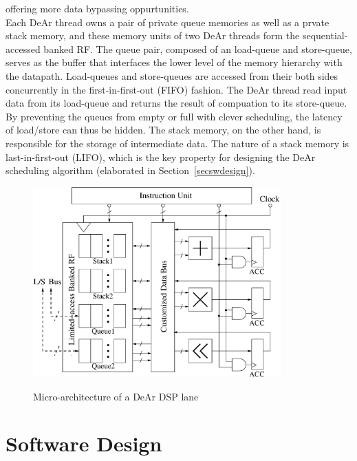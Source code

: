         offering more data bypassing oppurtunities.
        \\\indent
        Each DeAr thread owns a pair of private queue memories as well as a prvate stack memory, 
        and these memory units of two DeAr threads form the sequential-accessed banked RF.
        The queue pair, composed of an load-queue and store-queue, 
        serves as the buffer that interfaces the lower level of the memory hierarchy with the datapath.
        Load-queues and store-queues are accessed from their both sides concurrently in the first-in-first-out (FIFO) fashion.
        The DeAr thread read input data from its load-queue and returns the result of compuation to its store-queue.
        By preventing the queues from empty or full with clever scheduling, the latency of load/store can thus be hidden.
        The stack memory, on the other hand, is responsible for the storage of intermediate data.
        The nature of a stack memory is last-in-first-out (LIFO), 
        which is the key property for designing the DeAr scheduling algorithm (elaborated in Section~\ref{secswdesign}).
        \\\indent
          
        


        


        \begin{figure}[!ht] 
            \caption{Micro-architecture of a DeAr DSP lane}
            \centering
            \includegraphics[width=0.85\textwidth]{./figs/micro.eps}
            \label{fig:micro}
        \end{figure}
    \section{Software Design}
            \label{sec:swdesign}
